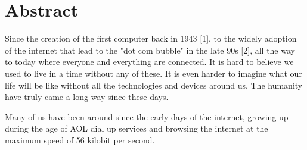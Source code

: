 \chapter*{Abstract}

Since the creation of the first computer back in 1943 [1], to the widely adoption of the internet that lead to the "dot com bubble" in the late 90s [2], all the way to today where everyone and everything are connected. It is hard to believe we used to live in a time without any of these. It is even harder to imagine what our life will be like without all the technologies and devices around us. The humanity have truly came a long way since these days.

Many of us have been around since the early days of the internet, growing up during the age of AOL dial up services and browsing the internet at the maximum speed of 56 kilobit per second.
